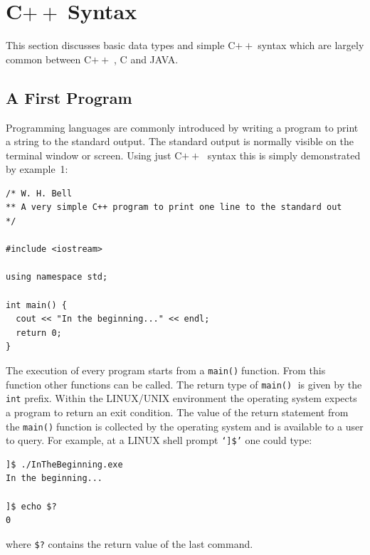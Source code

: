 \documentclass[11pt,a4paper]{scrartcl}
\def\cpp{C$++\;$}
\def\main{\texttt{main()}$\;$}
\begin{document}

\section{\cpp Syntax \label{section:cppsyntax}}
This section discusses basic data types and simple \cpp syntax which are largely common between \cpp, C and JAVA.


\subsection{A First Program}

Programming languages are commonly introduced by writing a program to
print a string to the standard output.  The standard output is
normally visible on the terminal window or screen.  Using just \cpp
syntax this is simply demonstrated by example~1:

\begin{verbatim}
/* W. H. Bell
** A very simple C++ program to print one line to the standard out
*/

#include <iostream>

using namespace std;

int main() {
  cout << "In the beginning..." << endl;
  return 0;
}
\end{verbatim}

The execution of every program starts from a \main function.  From
this function other functions can be called.  The return type of \main
is given by the \texttt{int} prefix.  Within the LINUX/UNIX
environment the operating system expects a program to return an exit
condition.  The value of the return statement from the \main function
is collected by the operating system and is available to a user to
query.  For example, at a LINUX shell prompt \texttt{`]\$'} one could type:

\begin{verbatim}
]$ ./InTheBeginning.exe 
In the beginning...

]$ echo $?
0
\end{verbatim}
where \texttt{\$?} contains the return value of the last command.
\end{document}
